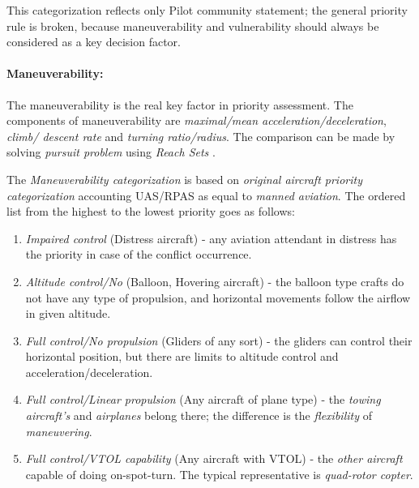 \begin{note}
    This categorization reflects only Pilot community statement; the general priority rule is broken, because maneuverability and vulnerability  should always be considered as a key decision factor. 
\end{note}


\paragraph{Maneuverability:} The maneuverability is the real key factor in priority assessment.  The components of maneuverability are \emph{maximal/mean acceleration/deceleration}, \emph{climb/ descent rate} and \emph{turning ratio/radius}. The comparison can be made by solving \emph{pursuit problem} using \emph{Reach Sets} \cite{game1987,game1988}.

\noindent The \emph{Maneuverability categorization} is based on \emph{original aircraft priority categorization} \cite{icaoAnnex2} accounting UAS/RPAS as equal to \emph{manned aviation}. The ordered list from the highest to the lowest priority goes as follows:

\begin{enumerate}
    \item \emph{Impaired control} (Distress aircraft) - any aviation attendant in distress has the priority in case of the conflict occurrence.
    
    \item \emph{Altitude control/No} (Balloon, Hovering aircraft) - the balloon type crafts do not have any type of propulsion, and horizontal movements follow the airflow in given altitude. 
    
    
    \item \emph{Full control/No propulsion} (Gliders of any sort) - the gliders can control their horizontal position, but there are limits to altitude control and acceleration/deceleration. 
    
    \item \emph{Full control/Linear propulsion} (Any aircraft of plane type) - the \emph{towing aircraft's} and \emph{airplanes} belong there; the difference is the \emph{flexibility} of \emph{maneuvering}.
    
    \item \emph{Full control/VTOL capability} (Any aircraft with VTOL) - the \emph{other aircraft} capable of doing on-spot-turn. The typical representative is \emph{quad-rotor copter}.
\end{enumerate}

